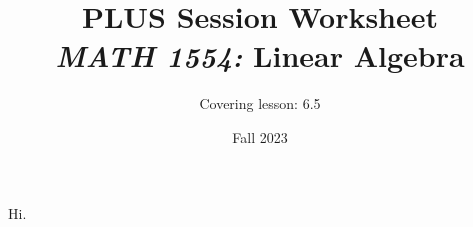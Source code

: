 \documentclass[10pt, titlepage]{article}
\title{\normalsize PLUS Session Worksheet \\[1em] \Large \textit{MATH 1554:} Linear Algebra}
\author{Covering lesson: 6.5}
\date{Fall 2023}
\begin{document}
	\maketitle

	Hi.
\end{document}
